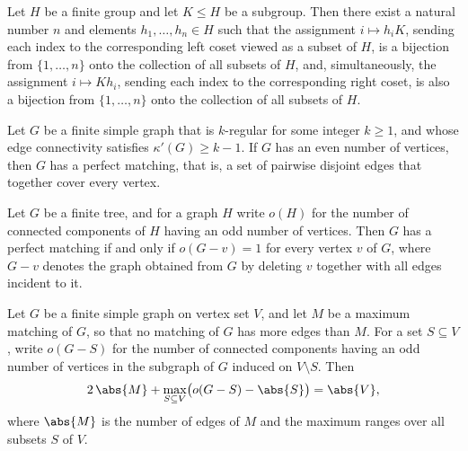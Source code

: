 \begin{theorem}
\label{SimpleGraph.exists_common_coset_transversal}
Let $H$ be a finite group and let $K \le H$ be a subgroup. Then there exist a natural
number $n$ and elements $h_1, \dots, h_n \in H$ such that the assignment $i \mapsto h_i
K$, sending each index to the corresponding left coset viewed as a subset of $H$, is a
bijection from $\{1, \dots, n\}$ onto the collection of all subsets of $H$, and,
simultaneously, the assignment $i \mapsto K h_i$, sending each index to the
corresponding right coset, is also a bijection from $\{1, \dots, n\}$ onto the
collection of all subsets of $H$.
\end{theorem}

\begin{theorem}
\label{SimpleGraph.perfectMatching_of_edgeConnected_regular}
Let $G$ be a finite simple graph that is $k$-regular for some integer $k \ge 1$, and
whose edge connectivity satisfies $\kappa'(G) \ge k - 1$. If $G$ has an even number of
vertices, then $G$ has a perfect matching, that is, a set of pairwise disjoint edges
that together cover every vertex.
\end{theorem}

\begin{theorem}
\label{SimpleGraph.isTree_perfectMatching_iff}
Let $G$ be a finite tree, and for a graph $H$ write $o(H)$ for the number of connected
components of $H$ having an odd number of vertices. Then $G$ has a perfect matching if
and only if $o(G - v) = 1$ for every vertex $v$ of $G$, where $G - v$ denotes the graph
obtained from $G$ by deleting $v$ together with all edges incident to it.
\end{theorem}

\begin{theorem}
\label{SimpleGraph.berge_tutte_defect}
Let $G$ be a finite simple graph on vertex set $V$, and let $M$ be a maximum matching of
$G$, so that no matching of $G$ has more edges than $M$. For a set $S \subseteq V$,
write $o(G - S)$ for the number of connected components having an odd number of vertices
in the subgraph of $G$ induced on $V \setminus S$. Then
\[
2\,\abs{M} + \max_{S \subseteq V}\bigl(o(G - S) - \abs{S}\bigr) = \abs{V},
\]
where $\abs{M}$ is the number of edges of $M$ and the maximum ranges over all subsets
$S$ of $V$.
\end{theorem}

